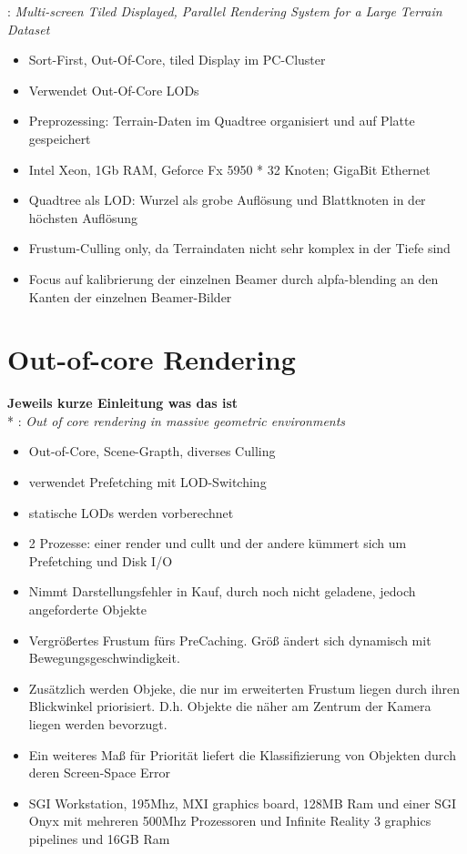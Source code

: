 \cite{DBLP:journals/ijvr/YinJSZ06}: \textit{Multi-screen Tiled Displayed, Parallel Rendering System for a Large Terrain Dataset}
\begin{itemize}
 \item Sort-First, Out-Of-Core, tiled Display im PC-Cluster
 \item Verwendet Out-Of-Core LODs
 \item Preprozessing: Terrain-Daten im Quadtree organisiert und auf Platte gespeichert
 \item Intel Xeon, 1Gb RAM, Geforce Fx 5950 * 32 Knoten; GigaBit Ethernet
 \item Quadtree als LOD: Wurzel als grobe Auflösung und Blattknoten in der höchsten Auflösung
 \item Frustum-Culling only, da Terraindaten nicht sehr komplex in der Tiefe sind
 \item Focus auf kalibrierung der einzelnen Beamer durch alpfa-blending an den Kanten der einzelnen Beamer-Bilder
\end{itemize}

\section{Out-of-core Rendering}
\textbf{Jeweils kurze Einleitung was das ist}\\*
\cite{manocha}: \textit{Out of core rendering in massive geometric environments}
\begin{itemize}
 \item Out-of-Core, Scene-Grapth, diverses Culling
 \item verwendet Prefetching mit LOD-Switching
 \item statische LODs werden vorberechnet
 \item 2 Prozesse: einer render und cullt und der andere kümmert sich um Prefetching und Disk I/O
 \item Nimmt Darstellungsfehler in Kauf, durch noch nicht geladene, jedoch angeforderte Objekte
 \item Vergrößertes Frustum fürs PreCaching. Größ ändert sich dynamisch mit Bewegungsgeschwindigkeit.
 \item Zusätzlich werden Objeke, die nur im erweiterten Frustum liegen durch ihren Blickwinkel priorisiert. D.h. Objekte die näher am Zentrum der Kamera liegen werden bevorzugt.
 \item Ein weiteres Maß für Priorität liefert die Klassifizierung von Objekten durch deren Screen-Space Error
 \item SGI Workstation, 195Mhz, MXI graphics board, 128MB Ram und einer SGI Onyx mit mehreren 500Mhz Prozessoren und Infinite Reality 3 graphics pipelines und 16GB Ram
\end{itemize}

